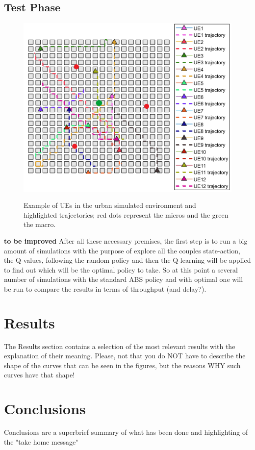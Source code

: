 \documentclass[conference,10pt]{IEEEtran}
\begin{document}
\subsection{Test Phase}

\begin{figure}[h]
\includegraphics[scale=0.68]{figures/traj.png}
\label{img:map}
\caption{Example of UEs in the urban simulated environment and highlighted trajectories; red dots represent the micros and the green the macro.} 
\end{figure}
\textbf{to be improved} After all these necessary premises, the first step is to run a big amount of simulations with the purpose of explore all the couples state-action, the Q-values, following the random policy and then the Q-learning will be applied to find out which will be the optimal policy to take. So at this point a several number of simulations with the standard ABS policy and with optimal one will be run to compare the results in terms of throughput (and delay?).         
\section{Results}\label{sec:res}
The Results section contains a selection of the most relevant results with the explanation of their meaning. Please, not that you do NOT have to describe the shape of the curves that can be seen in the figures, but the reasons WHY such curves have that shape!
\section{Conclusions}\label{sec:conclusion}
Conclusions are a superbrief summary of what has been done and highlighting of the "take home message"
\newpage
\nocite{*}


\end{document}
